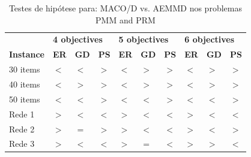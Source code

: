 \begin{table}[htb]
	\centering
	\def\arraystretch{1.0}
	\caption{Testes de hipótese para: MACO/D vs. AEMMD nos problemas PMM and PRM}
	\label{tab_ztest_meams}
	\begin{tabular}{llllllllll}
		& \multicolumn{3}{l}{\textbf{4 objectives}} & \multicolumn{3}{l}{\textbf{5 objectives}} & \multicolumn{3}{l}{\textbf{6 objectives
		}} \\
		\textbf{Instance} & \textbf{ER} & \textbf{GD} & \textbf{PS} & \textbf{ER} & \textbf{GD} & \textbf{PS} & \textbf{ER} & \textbf{GD} & \textbf{PS} \\ \hline
		30 items & \cellcolor{table-green} $<$ & \cellcolor{table-green} $<$ & \cellcolor{table-green} $>$ & \cellcolor{table-green} $<$ & \cellcolor{table-red} $>$ & \cellcolor{table-green} $>$ & \cellcolor{table-green} $<$ & \cellcolor{table-red} $>$ & \cellcolor{table-green} $>$ \\
		40 items & \cellcolor{table-green} $<$ & \cellcolor{table-red} $>$ & \cellcolor{table-green} $>$ & \cellcolor{table-green} $<$ & \cellcolor{table-red} $>$ & \cellcolor{table-green} $>$ & \cellcolor{table-green} $<$ & \cellcolor{table-red} $>$ & \cellcolor{table-green} $>$ \\
		50 items & \cellcolor{table-green} $<$ & \cellcolor{table-green} $<$ & \cellcolor{table-green} $>$ & \cellcolor{table-green} $<$ & \cellcolor{table-green} $<$ & \cellcolor{table-green} $>$ & \cellcolor{table-green} $<$ & \cellcolor{table-green} $<$ & \cellcolor{table-green} $>$ \\  \hline 
		Rede 1 & \cellcolor{table-red} $>$ & \cellcolor{table-green} $<$ & \cellcolor{table-red} $<$ & \cellcolor{table-red} $>$ & \cellcolor{table-green} $<$ & \cellcolor{table-red} $<$ & \cellcolor{table-red} $>$ & \cellcolor{table-green} $<$ & \cellcolor{table-red} $<$ \\
		Rede 2 & \cellcolor{table-red} $>$ & \cellcolor{white} $=$ & \cellcolor{table-green} $>$ & \cellcolor{table-red} $>$ & \cellcolor{table-green} $<$ & \cellcolor{table-red} $<$ & \cellcolor{table-red} $>$ & \cellcolor{table-green} $<$ & \cellcolor{table-green} $>$ \\
		Rede 3 & \cellcolor{table-red} $>$ & \cellcolor{table-green} $<$ & \cellcolor{table-red} $<$ & \cellcolor{table-red} $>$ & \cellcolor{white} $=$ & \cellcolor{table-red} $<$ & \cellcolor{table-red} $>$ & \cellcolor{table-red} $>$ & \cellcolor{table-red} $<$ \\  \hline 
	\end{tabular}
\end{table}

